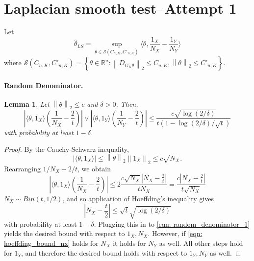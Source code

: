 \documentclass{article}
\newcommand{\Reals}{\mathbb{R}}
\newcommand{\norm}[1]{\left\lVert#1\right\rVert}
\newcommand{\abs}[1]{\left \lvert #1 \right \rvert}
\newcommand{\set}[1]{\left\{#1\right\}}
\newcommand{\dotp}[2]{\langle #1, #2 \rangle}
\newcommand{\1}{\mathbb{I}}
\theoremstyle{alden}
\theoremstyle{aldenthm}
\newtheorem{lemma}{Lemma}
\theoremstyle{definition}
\theoremstyle{remark}
\begin{document}
\section{Laplacian smooth test--Attempt 1}
Let
\begin{equation*}
\widehat{\theta}_{LS} = \sup_{\theta \in \mathcal{S}(C_{n,K}, C'_{n,K})} \dotp{\theta}{\frac{1_X}{N_X} - \frac{1_Y}{N_Y}}
\end{equation*}
where $\mathcal{S}(C_{n,K}, C'_{n,K}) = \set{\theta \in \Reals^n: \norm{D_{G_K\theta}}_2 \leq C_{n,K}, \norm{\theta}_2 \leq C'_{n,K}}$.

\paragraph{Random Denominator.}
\begin{lemma}
	Let $\norm{\theta}_2 \leq c$ and $\delta > 0$. Then,
	\begin{equation*}
	\abs{ \dotp{\theta}{1_X} \left(\frac{1}{N_X} - \frac{2}{t}\right) } \vee \abs{ \dotp{\theta}{1_Y} \left(\frac{1}{N_Y} - \frac{2}{t}\right) } \leq \frac{c \sqrt{\log(2 / \delta)}}{t (1 - \log(2/\delta)/\sqrt{t})}
	\end{equation*}
	with probability at least $1 - \delta$.
\end{lemma}
\begin{proof}
	By the Cauchy-Schwarz inequality,
	\begin{equation*}
	\abs{\dotp{\theta}{1_X}} \leq \norm{\theta}_2 \norm{1_X}_2 \leq c \sqrt{N_X}.
	\end{equation*}
	Rearranging $1/N_X - 2/t$, we obtain
	\begin{equation}
	\label{eqn: random_denominator_1}
	\abs{ \dotp{\theta}{1_X} \left(\frac{1}{N_X} - \frac{2}{t}\right) } \leq 2 \frac{c \sqrt{N_X} \abs{N_X - \frac{2}{t}}}{tN_X} = \frac{c \abs{N_X - \frac{2}{t}}}{t\sqrt{N_X}} 
	\end{equation}
	$N_X \sim Bin(t,1/2)$, and so application of Hoeffding's inequality gives
	\begin{equation}
	\label{eqn: hoeffding_bound_nx}
	\abs{N_X - \frac{t}{2}} \leq \sqrt{t} \sqrt{\log(2/\delta)}
	\end{equation}
	with probability at least $1 - \delta$. Plugging this in to \eqref{eqn: random_denominator_1} yields the desired bound with respect to $1_X,N_X$. However, if \eqref{eqn: hoeffding_bound_nx} holds for $N_X$ it holds for $N_Y$ as well. All other steps hold for $1_Y$, and therefore the desired bound holds with respect to $1_Y, N_Y$ as well.
\end{proof}
\end{document}
